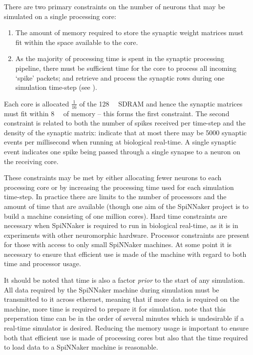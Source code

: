 \documentclass[conference]{IEEEtran}
\begin{document}
There are two primary constraints on the number of neurons that may be simulated on a single processing core:

  \begin{enumerate}
    \item The amount of memory required to store the synaptic weight matrices must fit within the space available to the core.
    \item As the majority of processing time is spent in the synaptic processing pipeline, there must be sufficient time for the core to process all incoming `spike' packets; and retrieve and process the synaptic rows during one simulation time-step (see \parencite{Sharp2013}).
  \end{enumerate}

Each core is allocated $\frac{1}{16}$ of the \SI{128}{\mebi\byte} SDRAM and hence the synaptic matrices must fit within \SI{8}{\mebi\byte} of memory -- this forms the first constraint.
The second constraint is related to both the number of spikes received per time-step and the density of the synaptic matrix: \textcite[\S III.C]{Sharp2013} indicate that at most there may be \num{5000} synaptic events per millisecond when running at biological real-time.
A single synaptic event indicates one spike being passed through a single synapse to a neuron on the receiving core.

These constraints may be met by either allocating fewer neurons to each processing core or by increasing the processing time used for each simulation time-step.
In practice there are limits to the number of processors and the amount of time that are available (though one aim of the SpiNNaker project is to build a machine consisting of one million cores).
Hard time constraints are necessary when SpiNNaker is required to run in biological real-time, as it is in experiments with other neuromorphic hardware.
Processor constraints are present for those with access to only small SpiNNaker machines.
At some point it is necessary to ensure that efficient use is made of the machine with regard to both time and processor usage.

It should be noted that time is also a factor \textit{prior} to the start of any simulation.
All data required by the SpiNNaker machine during simulation must be transmitted to it across ethernet, meaning that if more data is required on the machine, more time is required to prepare it for simulation.
\textcite{Sharp2013} note that this preperation time can be in the order of several minutes which is undesirable if a real-time simulator is desired.
Reducing the memory usage is important to ensure both that efficient use is made of processing cores but also that the time required to load data to a SpiNNaker machine is reasonable.
\end{document}
